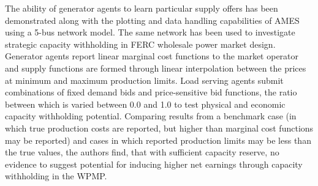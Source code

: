 The ability of generator agents to learn particular supply offers has been
demonstrated along with the plotting and data handling capabilities of AMES
using a 5-bus network model\cite{tesfatsi:pes09}.  The same network has been
used to investigate strategic capacity withholding in FERC wholesale power
market design\cite{tesfasi:psce}.  Generator agents report linear marginal cost
functions to the market operator and supply functions are formed through linear
interpolation between the prices at minimum and maximum production limits.
Load serving agents submit combinations of fixed demand bids and
price-sensitive bid functions, the ratio between which is varied between 0.0 and
1.0 to test physical and economic capacity withholding potential.  Comparing
results from a benchmark case (in which true production costs are reported,
but higher than marginal cost functions may be reported) and cases in which
reported production limits may be less than the true values, the authors find,
that with sufficient capacity reserve, no evidence to suggest potential for
inducing higher net earnings through capacity withholding in the WPMP.
